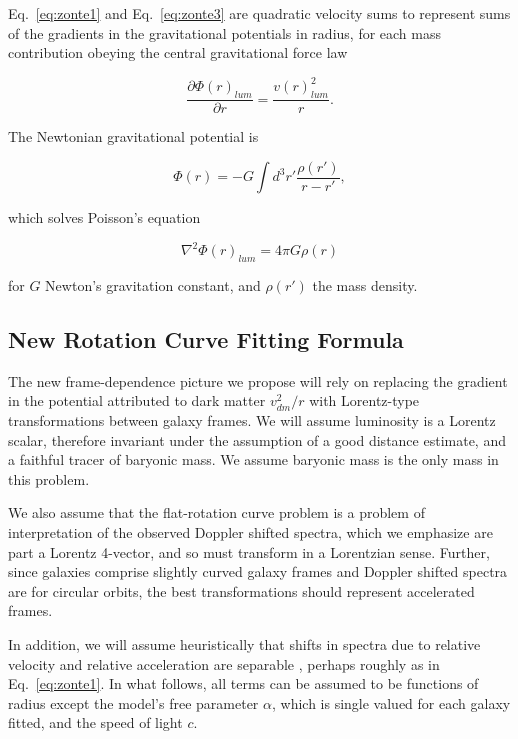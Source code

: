 \documentclass[reprint,%
 amsmath,amssymb,
 aps,
]{revtex4-1}
\begin{document}
    Eq.~\ref{eq:zonte1} and Eq.~\ref{eq:zonte3} are quadratic velocity   sums to represent  sums of the  gradients in the gravitational potentials in radius, 
 for each mass contribution obeying the  central gravitational    force law   

\begin{equation}
 \frac{\partial \Phi(r)_{lum}}{\partial r}    =\frac{v(r)_{lum}^2}{r}.   
    \label{zoochance1}
\end{equation}

  
The   Newtonian gravitational potential is

\begin{equation}
      \Phi(r)  = -G \int d^3r'  \frac{ \rho(r') }{r-r'} ,
      \label{eq:Newt}
      \end{equation}

which solves Poisson's equation

\begin{equation}
\nabla^2 \Phi(r)_{lum}  = 4\pi G \rho(r)   
    \label{whatsgood}
\end{equation}

 for $G$  Newton's   gravitation constant, and 
$\rho(r')$  the mass density. 
  



\subsection{New Rotation Curve Fitting Formula}

 The  new 
frame-dependence picture we propose will rely on 
replacing the gradient in the potential  attributed to   dark matter    $v^2_{dm}/r$   with  Lorentz-type transformations between galaxy frames.   We will   assume  luminosity   is a Lorentz scalar, therefore invariant under the assumption of a good distance estimate, and   a faithful tracer of baryonic mass.  We assume baryonic mass is the only mass in this problem. 

We also assume that the flat-rotation curve problem is a problem of interpretation of the observed   
   Doppler shifted spectra, which we emphasize are part  a Lorentz 4-vector, and so    must transform in a Lorentzian sense. Further, since galaxies comprise slightly curved galaxy frames and Doppler shifted spectra are for circular orbits, the best transformations should represent accelerated frames.
   
In addition, we will 
   assume  heuristically that shifts in   spectra   due to relative velocity and relative acceleration are separable \cite{Jack,Cisn}, perhaps roughly  as in Eq.~\ref{eq:zonte1}.
  In what follows, all   terms  can be assumed to  be functions of radius except the model's free parameter $\alpha$,  which is single valued for each galaxy fitted, and the speed of light $c$. 
   
\end{document}

